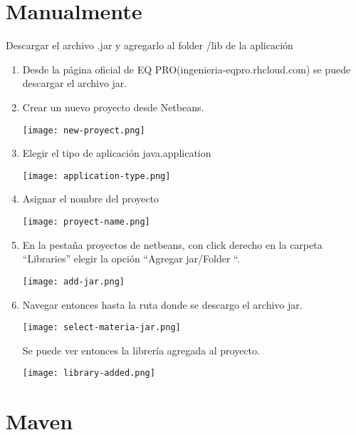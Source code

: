 	\section{Manualmente}\label{sec:manualInstall}
		Descargar el archivo .jar y agregarlo al folder /lib de la aplicación
		\begin{enumerate}
			\item Desde la página oficial de EQ PRO(ingenieria-eqpro.rhcloud.com) se puede descargar el archivo jar.

			\item Crear un nuevo proyecto desde Netbeans.

			\begin{center}
			  \texttt{[image: new-proyect.png]}
			\end{center}

			\item Elegir el tipo de aplicación java.application 
			\begin{center}
			  \texttt{[image: application-type.png]} 
			\end{center}
			\item Asignar el nombre del proyecto 
			\begin{center}
			  \texttt{[image: proyect-name.png]} 
			\end{center}
			\item En la pestaña proyectos de netbeans, con click derecho en la carpeta “Libraries” elegir la opción “Agregar jar/Folder “.
			\begin{center}
			  \texttt{[image: add-jar.png]} 
			\end{center}


			 \item Navegar entonces hasta la ruta donde se descargo el archivo jar. 

			\begin{center}
			  \texttt{[image: select-materia-jar.png]} 
			\end{center}

			Se puede ver entonces la librería agregada al proyecto.

			\begin{center}
			  \texttt{[image: library-added.png]} 
			\end{center}
		\end{enumerate}

	\section{Maven}\label{sec:mavenInstall}

